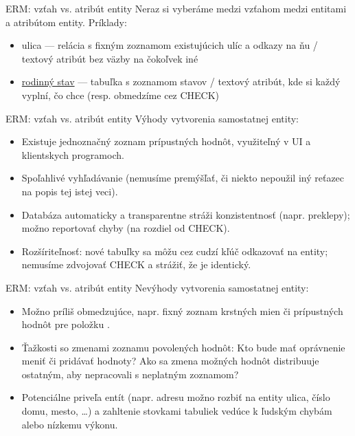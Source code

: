 \documentclass[12pt]{beamer}
\begin{document}
\begin{frame}[fragile]{ERM: vzťah vs. atribút entity}
Neraz si vyberáme medzi \alert{vzťahom medzi entitami}\\ a \alert{atribútom entity}. Príklady:
\begin{itemize}
\item ulica --- relácia s fixným zoznamom existujúcich ulíc a odkazy na ňu / textový atribút bez väzby na čokoľvek iné
\item \href{https://slovak.statistics.sk/PACVPEM/vocabPagesDetails.html?id=35201&lang=sk}{rodinný stav} ---
    tabuľka s  zoznamom stavov / textový atribút, kde si každý vyplní, čo chce (resp. obmedzíme cez CHECK)
\end{itemize}
\end{frame}

\begin{frame}[fragile]{ERM: vzťah vs. atribút entity}
Výhody vytvorenia samostatnej entity:
\begin{itemize}
\item Existuje jednoznačný zoznam prípustných hodnôt, využiteľný v UI a klientskych programoch.
\item Spoľahlivé vyhľadávanie (nemusíme premýšľať, či niekto nepoužil iný reťazec na popis tej istej veci).
\item Databáza automaticky a transparentne stráži konzistentnosť (napr. preklepy); možno  reportovať chyby (na rozdiel od CHECK).
\item Rozšíriteľnosť: nové tabuľky sa môžu cez cudzí kľúč odkazovať na entity; nemusíme zdvojovať CHECK a strážiť, že je identický.
\end{itemize}
\end{frame}

\begin{frame}[fragile]{ERM: vzťah vs. atribút entity}
Nevýhody vytvorenia samostatnej entity:
\begin{itemize}
\item Možno príliš obmedzujúce, napr. fixný zoznam krstných mien či prípustných hodnôt pre položku .
\item Ťažkosti so zmenami zoznamu povolených hodnôt:
    Kto bude mať oprávnenie meniť či pridávať hodnoty?
    Ako sa zmena možných hodnôt distribuuje ostatným, aby nepracovali s neplatným zoznamom?
\item Potenciálne priveľa entít (napr. adresu možno rozbiť na entity ulica, číslo domu, mesto, \dots)
    a zahltenie stovkami tabuliek vedúce k ľudským chybám alebo nízkemu výkonu.
\end{itemize}
\end{frame}
\end{document}
